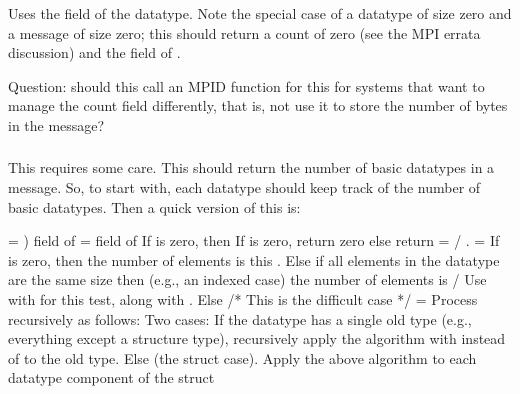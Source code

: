 \documentclass{article}
\begin{document}
\subsubsection{}
Uses the  field of the datatype.  Note the
special case of a 
datatype of size zero and a message of size zero; this should return a count
of zero (see the MPI errata discussion) and the
 field of .  

Question: should this call an MPID function for this for systems that want to
manage the count field differently, that is, not use it to store the number of
bytes in the message?  

\subsubsection{}
This requires some care.  This should return the number of basic datatypes in
a message.  So, to start with, each datatype should keep track of the number
of basic datatypes.  Then a quick version of this is:
\begin{algorithm}
 = ) field of 
         =  field of 
If  is zero, then
    If  is zero, return zero
    else return 
 =  / .  
   =  %
If  is zero, then 
    the number of elements is this 
    . 
Else if all elements in the datatype are the same size then
    (e.g., an indexed case)
    the number of elements is  /
    Use  with
     for this test, along
    with .
Else 
    /* This is the difficult case */
     = 
    Process  recursively as follows:
    Two cases:
    If the datatype has a single old type (e.g., everything except 
    a structure type), recursively apply the algorithm with  
    instead of  to the old type.
    Else 
       (the struct case).
       Apply the above algorithm to each datatype component of the
       struct
\end{algorithm}
\end{document}
